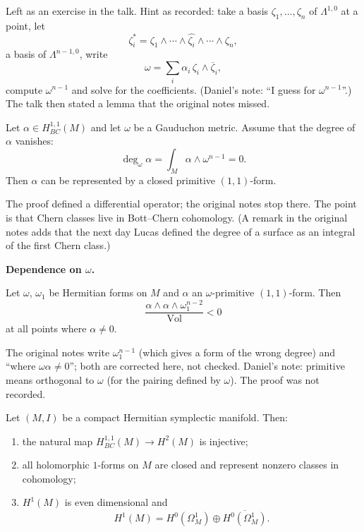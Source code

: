 Left as an exercise in the talk. Hint as
recorded: take a basis $\zeta_1,\ldots,
\zeta_n$ of $\Lambda^{1,0}$ at a point, let
$$
\zeta_i^*=\zeta_1\wedge\cdots\wedge
\widehat{\zeta_i}\wedge\cdots\wedge\zeta_n,
$$
a basis of $\Lambda^{n-1,0}$, write
$$
\omega=\sum_i\alpha_i\,\zeta_i\wedge
\overline{\zeta}_i,
$$
compute $\omega^{n-1}$ and solve for the
coefficients. (Daniel's note: ``I guess for
$\omega^{n-1}$''.) The talk then stated a
lemma that the original notes missed.

\begin{lemma}
\label{lemma-verbitsky-primitive-rep}
Let $\alpha\in H^{1,1}_{BC}(M)$ and let
$\omega$ be a Gauduchon metric. Assume that
the degree of $\alpha$ vanishes:
$$
\deg_\omega\alpha=
\int_M\alpha\wedge\omega^{n-1}=0.
$$
Then $\alpha$ can be represented by a
closed primitive $(1,1)$-form.
\end{lemma}

The proof defined a differential operator;
the original notes stop there. The point is
that Chern classes live in Bott--Chern
cohomology. (A remark in the original notes
adds that the next day Lucas defined the
degree of a surface as an integral of the
first Chern class.)

\medskip\noindent
{\bf Dependence on $\omega$.}

\begin{proposition}
\label{proposition-verbitsky-dependence}
Let $\omega$, $\omega_1$ be Hermitian forms
on $M$ and $\alpha$ an $\omega$-primitive
$(1,1)$-form. Then
$$
\frac{\alpha\wedge\alpha\wedge
\omega_1^{n-2}}{\operatorname{Vol}}<0
$$
at all points where $\alpha\neq 0$.
\end{proposition}

The original notes write $\omega_1^{n-1}$
(which gives a form of the wrong degree) and
``where $\omega\alpha\neq 0$''; both are
corrected here, not checked. Daniel's note:
primitive means orthogonal to $\omega$ (for
the pairing defined by $\omega$). The proof
was not recorded.

\begin{corollary}
\label{corollary-verbitsky-herm-sympl}
Let $(M,I)$ be a compact Hermitian
symplectic manifold. Then:
\begin{enumerate}
\item the natural map
$H^{1,1}_{BC}(M)\to H^2(M)$ is injective;
\item all holomorphic $1$-forms on $M$ are
closed and represent nonzero classes in
cohomology;
\item $H^1(M)$ is even dimensional and
$$
H^1(M)=H^0(\Omega^1_M)\oplus
\overline{H^0(\Omega^1_M)}.
$$
\end{enumerate}
\end{corollary}

